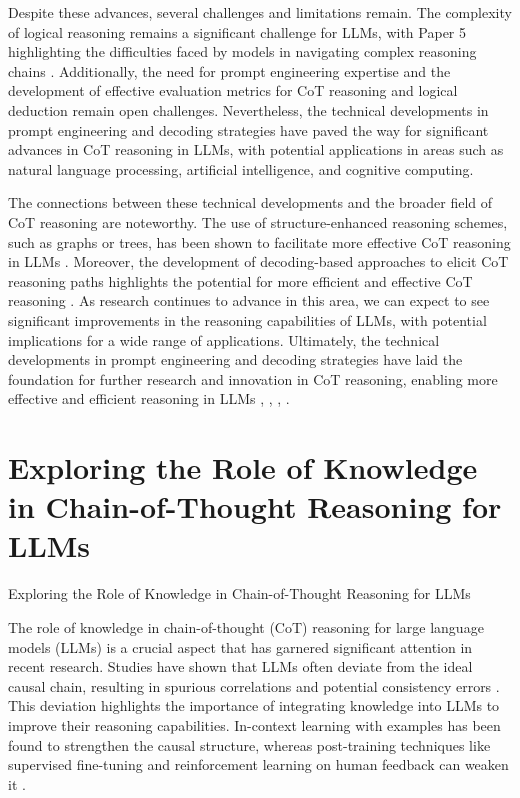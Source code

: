 \documentclass[conference]{IEEEtran}
\begin{document}
Despite these advances, several challenges and limitations remain. The complexity of logical reasoning remains a significant challenge for LLMs, with Paper 5 highlighting the difficulties faced by models in navigating complex reasoning chains \cite{b5}. Additionally, the need for prompt engineering expertise and the development of effective evaluation metrics for CoT reasoning and logical deduction remain open challenges. Nevertheless, the technical developments in prompt engineering and decoding strategies have paved the way for significant advances in CoT reasoning in LLMs, with potential applications in areas such as natural language processing, artificial intelligence, and cognitive computing.

The connections between these technical developments and the broader field of CoT reasoning are noteworthy. The use of structure-enhanced reasoning schemes, such as graphs or trees, has been shown to facilitate more effective CoT reasoning in LLMs \cite{b3}. Moreover, the development of decoding-based approaches to elicit CoT reasoning paths highlights the potential for more efficient and effective CoT reasoning \cite{b4}. As research continues to advance in this area, we can expect to see significant improvements in the reasoning capabilities of LLMs, with potential implications for a wide range of applications. Ultimately, the technical developments in prompt engineering and decoding strategies have laid the foundation for further research and innovation in CoT reasoning, enabling more effective and efficient reasoning in LLMs \cite{b1}, \cite{b3}, \cite{b4}, \cite{b5}.

\section{Exploring the Role of Knowledge in Chain-of-Thought Reasoning for LLMs}
Exploring the Role of Knowledge in Chain-of-Thought Reasoning for LLMs

The role of knowledge in chain-of-thought (CoT) reasoning for large language models (LLMs) is a crucial aspect that has garnered significant attention in recent research. Studies have shown that LLMs often deviate from the ideal causal chain, resulting in spurious correlations and potential consistency errors \cite{b1}. This deviation highlights the importance of integrating knowledge into LLMs to improve their reasoning capabilities. In-context learning with examples has been found to strengthen the causal structure, whereas post-training techniques like supervised fine-tuning and reinforcement learning on human feedback can weaken it \cite{b1}. 
\end{document}

